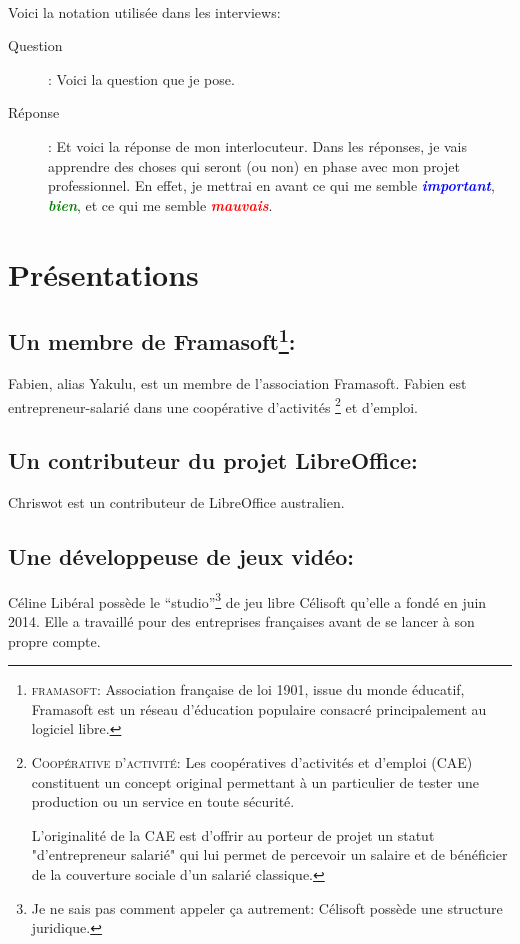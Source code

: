 \documentclass[a4paper,12pt, draft]{report}
\newcommand{\goodPoint}[1]{\textcolor{green}{\textbf{\textit{#1}}}}
\newcommand{\badPoint}[1]{\textcolor{red}{\textbf{\textit{#1}}}}
\newcommand{\importantPoint}[1]{\textcolor{blue}{\textbf{\textit{#1}}}}
\begin{document}
\paragraph{}
Voici la notation utilisée dans les interviews:
\begin{description}
\item [Question]: Voici la question que je pose.
\item [Réponse]: Et voici la réponse de mon interlocuteur. Dans les réponses, je vais apprendre des choses qui seront (ou non) en phase avec mon projet professionnel. En effet, je mettrai en avant ce qui me semble \importantPoint{important}, \goodPoint{bien}, et ce qui me semble \badPoint{mauvais}.
\end{description}


\section{Présentations}
\subsection[Un membre de Framasoft]{Un membre de Framasoft\footnote{\textsc{framasoft}: Association française de loi 1901, issue du monde éducatif, Framasoft est un réseau d'éducation populaire consacré principalement au logiciel libre. }: }
Fabien, alias Yakulu, est un membre de l'association Framasoft. Fabien est entrepreneur-salarié dans une coopérative d'activités \footnote{\textsc{Coopérative d'activité}: Les coopératives d'activités et d'emploi (CAE) constituent un concept original permettant à un particulier de tester une production ou un service en toute sécurité.

L'originalité de la CAE est d'offrir au porteur de projet un statut "d'entrepreneur salarié" qui lui permet de percevoir un salaire et de bénéficier de la couverture sociale d'un salarié classique.} et d'emploi.

\subsection[Un contributeur du projet LibreOffice]{Un contributeur du projet LibreOffice: }
Chriswot est un contributeur de LibreOffice australien.

\subsection[Une développeuse de jeux vidéo]{Une développeuse de jeux vidéo: }
Céline Libéral possède le ``studio''\footnote{Je ne sais pas comment appeler ça autrement: Célisoft possède une structure juridique.} de jeu libre Célisoft qu'elle a fondé en juin 2014. Elle a travaillé pour des entreprises françaises avant de se lancer à son propre compte.
\end{document}
